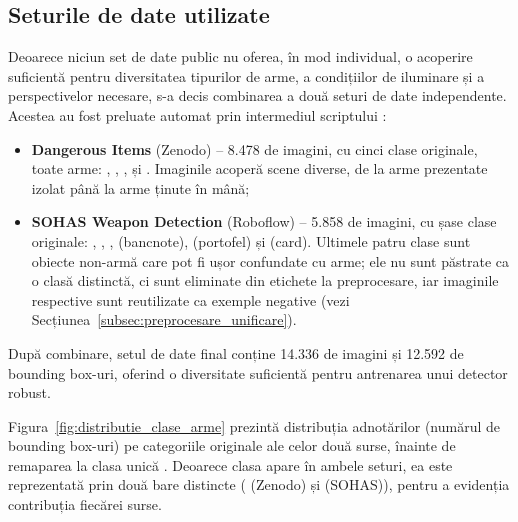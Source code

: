 \documentclass[../../main.tex]{subfiles}
\begin{document}
\subsection{Seturile de date utilizate}
\label{subsec:dataseturi_arme}

Deoarece niciun set de date public nu oferea, în mod individual, o acoperire suficientă pentru diversitatea tipurilor de arme, a condițiilor de iluminare și a perspectivelor necesare, s-a decis combinarea a două seturi de date independente. Acestea au fost preluate automat prin intermediul scriptului  :

\begin{itemize}
    \item \textbf{Dangerous Items} (Zenodo) -- 8.478 de imagini, cu cinci clase originale, toate
    arme: , , ,
     și . Imaginile acoperă scene diverse, de la arme
    prezentate izolat până la arme ținute în mână;
    \item \textbf{SOHAS Weapon Detection} (Roboflow) -- 5.858 de imagini, cu șase clase
    originale: , , ,
     (bancnote),  (portofel) și 
    (card). Ultimele patru clase sunt obiecte non-armă care pot fi ușor confundate cu arme;
    ele nu sunt păstrate ca o clasă distinctă, ci sunt eliminate din etichete la preprocesare,
    iar imaginile respective sunt reutilizate ca exemple negative (vezi
    Secțiunea~\ref{subsec:preprocesare_unificare}).
\end{itemize}

După combinare, setul de date final conține 14.336 de imagini și 12.592 de bounding box-uri,
oferind o diversitate suficientă pentru antrenarea unui detector robust.

Figura~\ref{fig:distributie_clase_arme} prezintă distribuția adnotărilor (numărul de bounding
box-uri) pe categoriile originale ale celor două surse, înainte de remaparea la clasa unică
. Deoarece clasa  apare în ambele seturi, ea este reprezentată
prin două bare distincte ( (Zenodo) și  (SOHAS)), pentru a
evidenția contribuția fiecărei surse.
\end{document}
